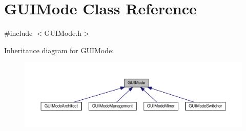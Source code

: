 \hypertarget{classGUIMode}{\section{G\-U\-I\-Mode Class Reference}
\label{classGUIMode}
}


{\ttfamily \#include $<$G\-U\-I\-Mode.\-h$>$}



Inheritance diagram for G\-U\-I\-Mode\-:
\nopagebreak
\begin{figure}[H]
\begin{center}
\leavevmode
\includegraphics[width=350pt]{classGUIMode__inherit__graph}
\end{center}
\end{figure}
